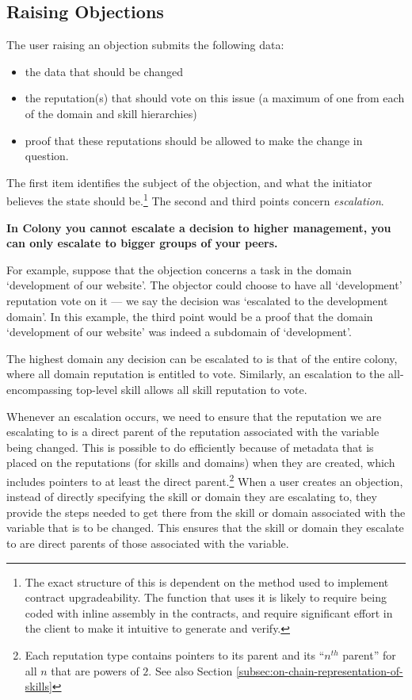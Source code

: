 \subsection{Raising Objections}\label{subsec:raising-objections}

The user raising an objection submits the following data:
\begin{itemize}
 \item the data that should be changed
 \item the reputation(s) that should vote on this issue (a maximum of one from each of the domain and skill hierarchies)
 \item proof that these reputations should be allowed to make the change in question. 
\end{itemize}

The first item identifies the subject of the objection, and what the initiator believes the state should be.\footnote{The exact structure of this is dependent on the method used to implement contract upgradeability. The function that uses it is likely to require being coded with inline assembly in the contracts, and require significant effort in the client to make it intuitive to generate and verify.} The second and third points concern \emph{escalation}. 

\begin{center}
 \textbf{In Colony you cannot escalate a decision to higher management, you can only escalate to bigger groups of your peers.}
\end{center}

For example, suppose that the objection concerns a task in the domain `development of our website'. The objector could choose to have all `development' reputation vote on it --- we say the decision was `escalated to the development domain'. In this example, the third point would be a proof that the domain `development of our website' was indeed a subdomain of `development'.

The highest domain any decision can be escalated to is that of the entire colony, where all domain reputation is entitled to vote. Similarly, an escalation to the all-encompassing top-level skill allows all skill reputation to vote.

Whenever an escalation occurs, we need to ensure that the reputation we are escalating to is a direct parent of the reputation associated with the variable being changed. This is possible to do efficiently because of metadata that is placed on the reputations (for skills and domains) when they are created, which includes pointers to at least the direct parent.\footnote{Each reputation type contains pointers to its parent  and its ``$n^{th}$ parent''  for all $n$ that are powers of $2$. See also Section \ref{subsec:on-chain-representation-of-skills}} When a user creates an objection, instead of directly specifying the skill or domain they are escalating to, they provide the steps needed to get there from the skill or domain associated with the variable that is to be changed. This ensures that the skill or domain they escalate to are direct parents of those associated with the variable.

